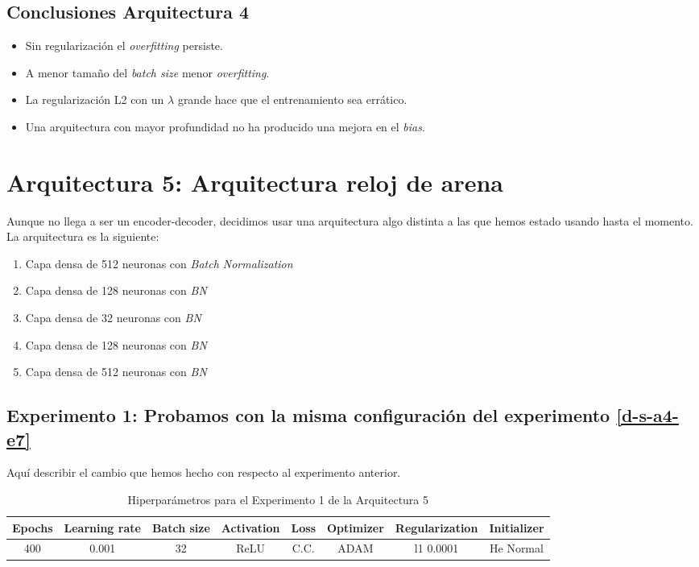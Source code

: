 \documentclass{article}
\begin{document}
        \subsection{Conclusiones Arquitectura 4}
        \label{d-cl-a4}
            \begin{itemize}
                \item Sin regularizaci\'on el \textit{overfitting} persiste.
                \item A menor tama\~no del \textit{batch size} menor \textit{overfitting}.
                \item La regularizaci\'on L2 con un $\lambda$ grande hace que el entrenamiento sea err\'atico.
                \item Una arquitectura con mayor profundidad no ha producido una mejora en el \textit{bias}.
            \end{itemize}
            

    \section{Arquitectura 5: Arquitectura reloj de arena}
	\label{d-s-a5}
		Aunque no llega a ser un encoder-decoder, decidimos usar una arquitectura algo distinta a las que hemos estado usando hasta el momento. La arquitectura es la siguiente:
		\begin{enumerate}
			\item Capa densa de 512 neuronas con \textit{Batch Normalization}
			\item Capa densa de 128 neuronas con \textit{BN}
			\item Capa densa de 32 neuronas con \textit{BN}
			\item Capa densa de 128 neuronas con \textit{BN}
			\item Capa densa de 512 neuronas con \textit{BN}
		\end{enumerate}
		
		\subsection{Experimento 1: Probamos con la misma configuraci\'on del experimento \ref{d-s-a4-e7}}
		\label{d-s-a5-e1}
			Aqu\'i describir el cambio que hemos hecho con respecto al experimento anterior.
		
			\begin{table}[!h]
				\begin{center}
					\begin{tabular}{| c | c | c | c | c | c | c | c |}
						\textbf{Epochs} & \textbf{Learning rate} & \textbf{Batch size} & \textbf{Activation} & \textbf{Loss} & \textbf{Optimizer} & \textbf{Regularization} & \textbf{Initializer}\\ \hline
						 400 & 0.001 & 32 & ReLU & C.C. & ADAM & l1 0.0001 & He Normal
					\end{tabular}
					\caption{Hiperpar\'ametros para el Experimento 1 de la Arquitectura 5}
					\label{tab:hip-d-a5-e1}
				\end{center}
			\end{table}
			
\end{document}
